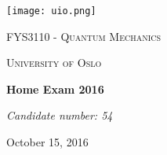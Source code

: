 \documentclass{scrartcl}
\begin{document}
\begin{titlepage}
	\centering
	\texttt{[image: uio.png]}\par\vspace{1cm}
	{\scshape\LARGE FYS3110 - Quantum Mechanics \par}
	\vspace{1cm}
	{\scshape\Large University of Oslo\par}
	\vspace{5.5cm}
	{\huge\bfseries Home Exam 2016\par}
	\vspace{1.5cm}
	{\Large\itshape Candidate number: 54\par}
	\vfill
	{\large October 15, 2016\par}
\end{titlepage}
\end{document}
